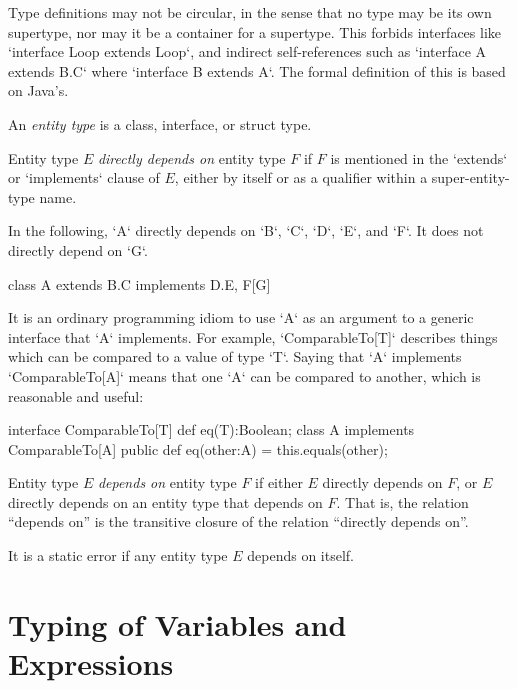 Type definitions may not be circular, in the sense that no type may be its own
supertype, nor may it be a container for a supertype. This forbids interfaces
like \xcd`interface Loop extends Loop`, and indirect self-references such as
\xcd`interface A extends B.C` where \xcd`interface B extends A`.  
The formal definition of this is based on Java's.  

An {\em entity type} is a class, interface, or struct type.   

Entity type $E$ {\em directly depends on} entity type $F$ if $F$ is mentioned
in the \xcd`extends` or \xcd`implements` clause of $E$, either by itself or as
a qualifier within a super-entity-type name.  

\begin{ex}
In the following, \xcd`A` directly depends on \xcd`B`, \xcd`C`, \xcd`D`, 
\xcd`E`, and \xcd`F`.    It does not directly depend on \xcd`G`.
\begin{xten}
class A extends B.C implements D.E, F[G] {}
\end{xten}
%

It is an ordinary programming idiom to use \xcd`A` as an argument to a generic
interface that \xcd`A` implements.  For example, \xcd`ComparableTo[T]`
describes things which can be compared to a value of type \xcd`T`. Saying that
\xcd`A` implements \xcd`ComparableTo[A]` means that one \xcd`A` can be
compared to another, which is reasonable and useful: 
\begin{xten}
interface ComparableTo[T] {
  def eq(T):Boolean;
}
class A implements ComparableTo[A] {
  public def eq(other:A) = this.equals(other);
}
\end{xten}
%
\end{ex}

Entity type $E$ {\em depends on} entity type $F$ if
either $E$ directly depends on $F$, or $E$ directly depends on an entity type
that depends on $F$.   That is, the relation ``depends on'' is the transitive
closure of the relation ``directly depends on''.  

It is a static error if any entity type $E$ depends on itself.

\section{Typing of Variables and Expressions}


